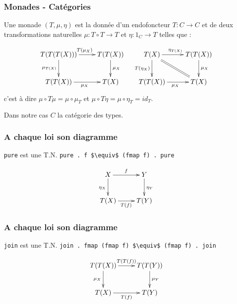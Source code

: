 \documentclass{beamer}
\begin{document}
\begin{frame}
\frametitle{Monades - Catégories}
Une monade $(T, \mu, \eta)$ est la donnée d'un
endofoncteur $T : C \rightarrow C$ et de deux
transformations naturelles $\mu : T\circ T \rightarrow T$ et $\eta : 1_C \rightarrow T$ telles que :

\[
\begin{array}{cc}
\xymatrix{
T(T(T(X))) \ar[r]^{T(\mu_X)} \ar[d]_{\mu_{T(X)}} & T(T(X)) \ar[d]^{\mu_X} \\
T(T(X)) \ar[r]_{\mu_X} & T(X) \\
}
&
\xymatrix{
T(X) \ar[r]^{\eta_{T(X)}} \ar[d]_{T(\eta_X)}  \ar@{=}[dr] & T(T(X)) \ar[d]^{\mu_X} \\
T(T(X)) \ar[r]_{\mu_X} & T(X) \\
}
\end{array}
\]
c'est à dire
$\mu \circ T\mu = \mu \circ \mu_T$
et
$\mu \circ T \eta = \mu \circ \eta_T = id_T$.

\pause
\medskip\medskip
Dans notre cas $C$ la catégorie des types.
\end{frame}

\begin{frame}
\frametitle{A chaque loi son diagramme}
\begin{alertblock}{\verb!pure! est une T.N.}
\verb!pure . f $\equiv$ (fmap f) . pure!
\end{alertblock}

\begin{block}{}
\[
\xymatrix{
X \ar[r]^{f} \ar[d]_{\eta_X} & Y \ar[d]^{\eta_Y} \\
T(X) \ar[r]_{T(f)} & T(Y) \\
}
\]
\end{block}

\end{frame}

\begin{frame}
\frametitle{A chaque loi son diagramme}
\begin{alertblock}{\verb!join! est une T.N.}
\verb!join . fmap (fmap f) $\equiv$ (fmap f) . join!
\end{alertblock}

\begin{block}{}
\[
\xymatrix{
T(T(X)) \ar[r]^{T(T(f))} \ar[d]_{\mu_{X}} & T(T(Y)) \ar[d]^{\mu_{Y}} \\
T(X) \ar[r]_{T(f)} & T(Y) \\
}
\]
\end{block}

\end{frame}
\end{document}
